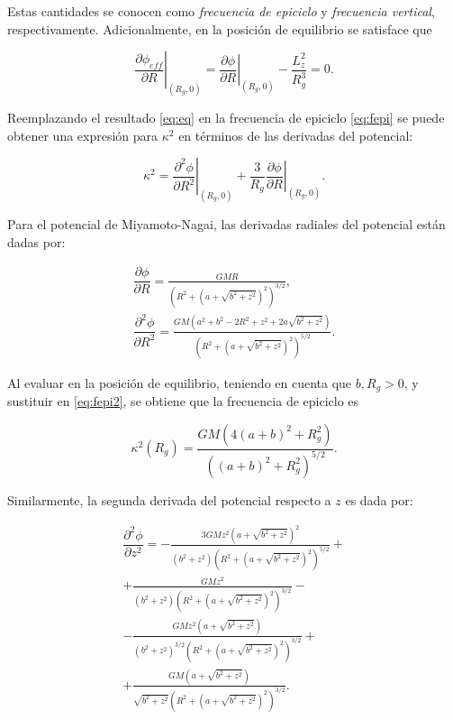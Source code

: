 \documentclass[final,5p,times,twocolumn, nopreprintline]{elsarticle}
\numberwithin{equation}{section}
\begin{document}
Estas cantidades se conocen como \emph{frecuencia de epiciclo} y \emph{frecuencia vertical}, respectivamente. Adicionalmente, en la posición de equilibrio se satisface que

\begin{equation}
\left.\dfrac{\partial\phi_{eff}}{\partial R}\right|_{(R_g,0)}=\left.\dfrac{\partial\phi}{\partial R}\right|_{(R_g,0)}-\dfrac{L_z^2}{R_g^3}=0. \label{eq:eq}
\end{equation}

Reemplazando el resultado \ref{eq:eq} en la frecuencia de epiciclo \ref{eq:fepi} se puede obtener una expresión para $\kappa^2$ en términos de las derivadas del potencial:

\begin{equation}
\kappa^2=\left.\dfrac{\partial^2\phi}{\partial R^2}\right|_{(R_g,0)}+\dfrac{3}{R_g}\left.\dfrac{\partial\phi}{\partial R}\right|_{(R_g,0)}. \label{eq:fepi2}
\end{equation}

Para el potencial de Miyamoto-Nagai, las derivadas radiales del potencial están dadas por:

\begin{align}
\dfrac{\partial\phi}{\partial R}=\frac{G M R}{\left(R^2+\left(a+\sqrt{b^2+z^2}\right)^2\right)^{3/2}}\label{eq:dphidR},\\
\dfrac{\partial^2\phi}{\partial R^2}=\frac{G M \left(a^2+b^2-2 R^2+z^2+2 a \sqrt{b^2+z^2}\right)}{\left(R^2+\left(a+\sqrt{b^2+z^2}\right)^2\right)^{5/2}}.\label{eq:d2phidR2}
\end{align}

Al evaluar en la posición de equilibrio, teniendo en cuenta que $b,R_g>0$, y sustituir en \ref{eq:fepi2}, se obtiene que la frecuencia de epiciclo es

\begin{equation}
\kappa^2(R_g)=\frac{G M \left(4 (a+b)^2+R_g^2\right)}{\left((a+b)^2+R_g^2\right)^{5/2}}. \label{eq:fepiMN}
\end{equation}

Similarmente, la segunda derivada del potencial respecto a $z$ es dada por:

\begin{align}
\dfrac{\partial^2\phi}{\partial z^2}=-\frac{3 G M z^2 \left(a+\sqrt{b^2+z^2}\right)^2}{\left(b^2+z^2\right) \left(R^2+\left(a+\sqrt{b^2+z^2}\right)^2\right)^{5/2}}+\nonumber\\+\frac{G
M z^2}{\left(b^2+z^2\right) \left(R^2+\left(a+\sqrt{b^2+z^2}\right)^2\right)^{3/2}}-\nonumber\\-\frac{G M z^2 \left(a+\sqrt{b^2+z^2}\right)}{\left(b^2+z^2\right)^{3/2}
\left(R^2+\left(a+\sqrt{b^2+z^2}\right)^2\right)^{3/2}}+\nonumber\\+\frac{G M \left(a+\sqrt{b^2+z^2}\right)}{\sqrt{b^2+z^2} \left(R^2+\left(a+\sqrt{b^2+z^2}\right)^2\right)^{3/2}}.\label{eq:d2phidz2}
\end{align}
\end{document}
